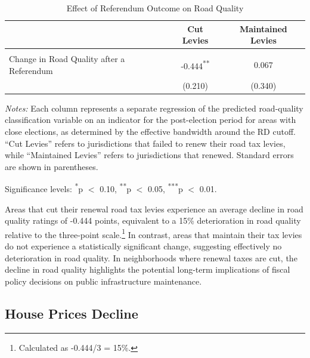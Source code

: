 \begin{table}[ht]
    \centering
    \caption{Effect of Referendum Outcome on Road Quality}
    \label{tab:roadquality_estimates}
    \begin{threeparttable}
    \begin{tabular}{lcc}
    \hline\hline
     & \textbf{Cut Levies} & \textbf{Maintained Levies} \\
    \hline
    \\[-0.3cm] %
    Change in Road Quality after a Referendum 
     & -0.444\textsuperscript{**} & 0.067 \\[0.2cm] %
     & (0.210) & (0.340) \\  
    \hline
    \end{tabular}
    \begin{tablenotes}
    \small
    \item \textit{Notes:} Each column represents a separate regression of the predicted  road-quality classification variable on an indicator for the post-election period for areas with close elections, as determined by the effective bandwidth around the RD cutoff. “Cut Levies” refers to jurisdictions that failed to renew their road tax levies, while “Maintained Levies” refers to jurisdictions that renewed. Standard errors are shown in parentheses. 
    
    \item Significance levels: 
    \textsuperscript{*}p $<$ 0.10,  
    \textsuperscript{**}p $<$ 0.05, 
    \textsuperscript{***}p $<$ 0.01.
    \end{tablenotes}
    \end{threeparttable}
\end{table}


Areas that cut their renewal road tax levies experience an average decline in road quality ratings of -0.444 points, equivalent to a 15\% deterioration in road quality relative to the three-point scale.\footnote{Calculated as -0.444/3 = 15\%.} In contrast, areas that maintain their tax levies do not experience a statistically significant change, suggesting effectively no deterioration in road quality. In neighborhoods where renewal taxes are cut, the decline in road quality highlights the potential long-term implications of fiscal policy decisions on public infrastructure maintenance.

\subsection{House Prices Decline}

